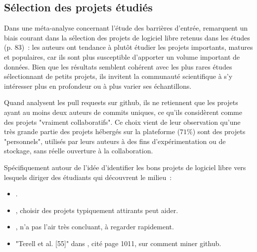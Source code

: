 \subsection{Sélection des projets étudiés}

Dans une méta-analyse concernant l'étude des barrières d'entrée,  remarquent
un biais courant dans la sélection des projets de logiciel libre retenus dans les études (p. 83) : les auteurs
ont tendance à plutôt étudier les projets importants, matures et populaires, car ils sont plus susceptible
d'apporter un volume important de données. Bien que les résultats semblent cohérent avec les plus rares études
sélectionnant de petits projets, ils invitent la communauté scientifique à s'y intéresser plus en profondeur
ou à plus varier ses échantillons.

Quand  analysent les \glspl{pull request} sur \gls{github}, ils ne retiennent
que les projets ayant au moins deux auteurs de \glspl{commit} uniques, ce qu'ils considèrent comme des projets
"vraiment collaboratifs". Ce choix vient de leur observation qu'une très grande partie des projets hébergés
sur la plateforme ($71\%$) sont des projets "personnels", utilisés par leurs auteurs à des fins
d'expérimentation ou de stockage, sans réelle ouverture à la collaboration.


Spécifiquement autour de l'idée d'identifier les bons projets de logiciel libre vers lesquels diriger des
étudiants qui découvrent le milieu :

\begin{itemize}
    \item {}.
    \item {}, choisir des projets typiquement attirants peut aider.
    \item {}, n'a pas l'air très concluant, à regarder rapidement.
    \item "Terell et al. [55]" dans \textcite{barriers-2018}, cité page 1011, sur comment miner \gls{github}.
\end{itemize}
